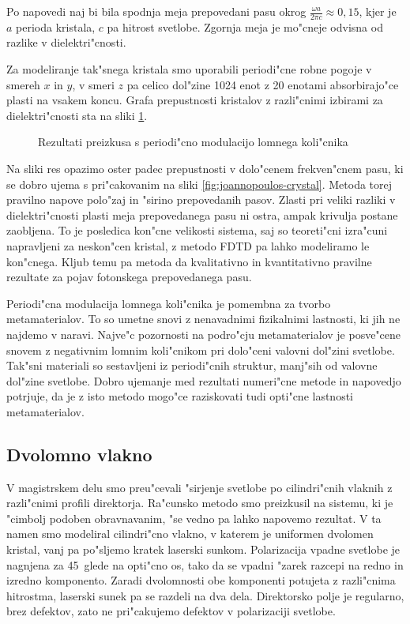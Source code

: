 \documentclass[a4paper,10pt]{article}
\begin{document}
Po napovedi naj bi bila spodnja meja prepovedani pasu okrog $\frac{\omega a}{2\pi c} \approx 0,\!15$, kjer je $a$ perioda kristala, $c$ pa hitrost svetlobe. 
Zgornja meja je mo"cneje odvisna od razlike v dielektri"cnosti\cite{joannopoulos}. 

Za modeliranje tak"snega kristala smo uporabili periodi"cne robne pogoje v smereh $x$ in $y$, v smeri $z$ pa celico dol"zine 1024 enot z 20 enotami absorbirajo"ce plasti na vsakem koncu. 
Grafa prepustnosti kristalov z razli"cnimi izbirami za dielektri"cnosti sta na sliki \ref{fig:test-periodic}. 

\begin{figure}[!htbp]
 
 \caption{Rezultati preizkusa s periodi"cno modulacijo lomnega koli"cnika}
 \label{fig:test-periodic}
\end{figure}

Na sliki res opazimo oster padec prepustnosti v dolo"cenem frekven"cnem pasu, ki se dobro ujema s pri"cakovanim na sliki \ref{fig:joannopoulos-crystal}. 
Metoda torej pravilno napove polo"zaj in "sirino prepovedanih pasov. 
Zlasti pri veliki razliki v dielektri"cnosti plasti meja prepovedanega pasu ni ostra, ampak krivulja postane zaobljena. 
To je posledica kon"cne velikosti sistema, saj so teoreti"cni izra"cuni napravljeni za neskon"cen kristal, z metodo \acs{FDTD} pa lahko modeliramo le kon"cnega. 
Kljub temu pa metoda da kvalitativno in kvantitativno pravilne rezultate za pojav fotonskega prepovedanega pasu. 

Periodi"cna modulacija lomnega koli"cnika je pomembna za tvorbo metamaterialov\cite{metamaterials}. 
To so umetne snovi z nenavadnimi fizikalnimi lastnosti, ki jih ne najdemo v naravi. 
Najve"c pozornosti na podro"cju metamaterialov je posve"cene snovem z negativnim lomnim koli"cnikom pri dolo"ceni valovni dol"zini svetlobe. 
Tak"sni materiali so sestavljeni iz periodi"cnih struktur, manj"sih od valovne dol"zine svetlobe. 
Dobro ujemanje med rezultati numeri"cne metode in napovedjo potrjuje, da je z isto metodo mogo"ce raziskovati tudi opti"cne lastnosti metamaterialov. 

\subsection{Dvolomno vlakno}
V magistrskem delu smo preu"cevali "sirjenje svetlobe po cilindri"cnih vlaknih z razli"cnimi profili direktorja. 
Ra"cunsko metodo smo preizkusil na sistemu, ki je "cimbolj podoben obravnavanim, "se vedno pa lahko napovemo rezultat. 
V ta namen smo modeliral cilindri"cno vlakno, v katerem je uniformen dvolomen kristal, vanj pa po"sljemo kratek laserski sunkom. 
Polarizacija vpadne svetlobe je nagnjena za 45\degree~glede na opti"cno os, tako da se vpadni "zarek razcepi na redno in izredno komponento. 
Zaradi dvolomnosti obe komponenti potujeta z razli"cnima hitrostma, laserski sunek pa se razdeli na dva dela. 
Direktorsko polje je regularno, brez defektov, zato ne pri"cakujemo defektov v polarizaciji svetlobe. 
\end{document}
